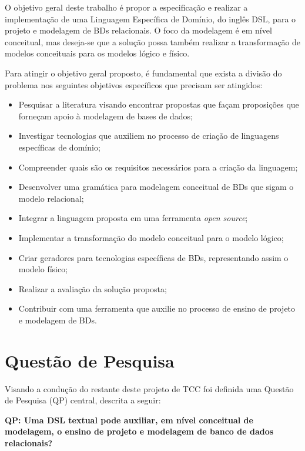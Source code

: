 O objetivo geral deste trabalho é propor a especificação e realizar a implementação de uma Linguagem Específica de Domínio, do inglês \ac{DSL}, para o projeto e modelagem de \acp{BD} relacionais. 
O foco da modelagem é em nível conceitual, mas deseja-se que a solução possa também realizar a transformação de modelos conceituais para os modelos lógico e físico. 

Para atingir o objetivo geral proposto, é fundamental que exista a divisão do problema nos seguintes objetivos específicos que precisam ser atingidos:

\begin{itemize} 
    \item Pesquisar a literatura visando encontrar propostas que façam proposições que forneçam apoio à modelagem de bases de dados; 
    \item Investigar tecnologias que auxiliem no processo de criação de linguagens específicas de domínio;
    \item Compreender quais são os requisitos necessários para a criação da linguagem;
    \item Desenvolver uma gramática para modelagem conceitual de \acp{BD} que sigam o modelo relacional;
    \item Integrar a linguagem proposta em uma ferramenta \textit{open source};
    \item Implementar a transformação do modelo conceitual para o modelo lógico;
    \item Criar geradores para tecnologias específicas de \acp{BD}, representando assim o modelo físico;
    \item Realizar a avaliação da solução proposta;
    \item Contribuir com uma ferramenta que auxilie no processo de ensino de projeto e modelagem de \acp{BD}.
\end{itemize}

\section{Questão de Pesquisa}

Visando a condução do restante deste projeto de \ac{TCC} foi definida uma Questão de Pesquisa (QP) central, descrita a seguir:

\textbf{QP: Uma \ac{DSL} textual pode auxiliar, em nível conceitual de modelagem, o ensino de projeto e modelagem de banco de dados relacionais?}

